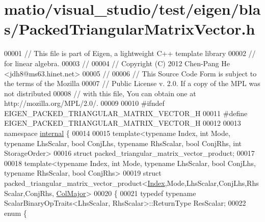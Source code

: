 \hypertarget{matio_2visual__studio_2test_2eigen_2blas_2_packed_triangular_matrix_vector_8h_source}{}\section{matio/visual\+\_\+studio/test/eigen/blas/\+Packed\+Triangular\+Matrix\+Vector.h}
\label{matio_2visual__studio_2test_2eigen_2blas_2_packed_triangular_matrix_vector_8h_source}

\begin{DoxyCode}
00001 \textcolor{comment}{// This file is part of Eigen, a lightweight C++ template library}
00002 \textcolor{comment}{// for linear algebra.}
00003 \textcolor{comment}{//}
00004 \textcolor{comment}{// Copyright (C) 2012 Chen-Pang He <jdh8@ms63.hinet.net>}
00005 \textcolor{comment}{//}
00006 \textcolor{comment}{// This Source Code Form is subject to the terms of the Mozilla}
00007 \textcolor{comment}{// Public License v. 2.0. If a copy of the MPL was not distributed}
00008 \textcolor{comment}{// with this file, You can obtain one at http://mozilla.org/MPL/2.0/.}
00009 
00010 \textcolor{preprocessor}{#ifndef EIGEN\_PACKED\_TRIANGULAR\_MATRIX\_VECTOR\_H}
00011 \textcolor{preprocessor}{#define EIGEN\_PACKED\_TRIANGULAR\_MATRIX\_VECTOR\_H}
00012 
00013 \textcolor{keyword}{namespace }\hyperlink{namespaceinternal}{internal} \{
00014 
00015 \textcolor{keyword}{template}<\textcolor{keyword}{typename} Index, \textcolor{keywordtype}{int} Mode, \textcolor{keyword}{typename} LhsScalar, \textcolor{keywordtype}{bool} ConjLhs, \textcolor{keyword}{typename} RhsScalar, \textcolor{keywordtype}{bool} ConjRhs, \textcolor{keywordtype}{int} 
      StorageOrder>
00016 \textcolor{keyword}{struct }packed\_triangular\_matrix\_vector\_product;
00017 
00018 \textcolor{keyword}{template}<\textcolor{keyword}{typename} Index, \textcolor{keywordtype}{int} Mode, \textcolor{keyword}{typename} LhsScalar, \textcolor{keywordtype}{bool} ConjLhs, \textcolor{keyword}{typename} RhsScalar, \textcolor{keywordtype}{bool} ConjRhs>
00019 \textcolor{keyword}{struct }packed\_triangular\_matrix\_vector\_product<\hyperlink{namespace_eigen_a62e77e0933482dafde8fe197d9a2cfde}{Index},Mode,LhsScalar,ConjLhs,RhsScalar,ConjRhs,
      \hyperlink{group__enums_ggaacded1a18ae58b0f554751f6cdf9eb13a0cbd4bdd0abcfc0224c5fcb5e4f6669a}{ColMajor}>
00020 \{
00021   \textcolor{keyword}{typedef} \textcolor{keyword}{typename} ScalarBinaryOpTraits<LhsScalar, RhsScalar>::ReturnType ResScalar;
00022   \textcolor{keyword}{enum} \{

\end{DoxyCode}
